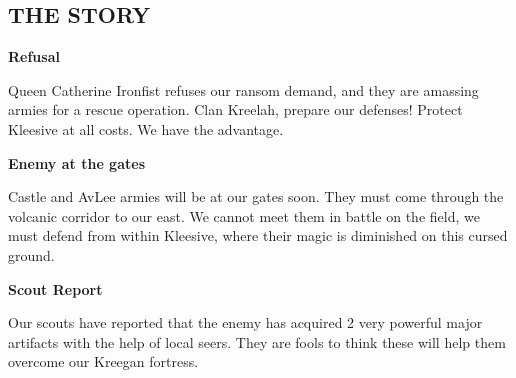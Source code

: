 \begin{multicols}{2}
\subsection*{\MakeUppercase{The Story}}

\textbf{Refusal}

Queen Catherine Ironfist refuses our ransom demand, and they are amassing armies for a rescue operation.
Clan Kreelah, prepare our defenses!
Protect Kleesive at all costs.
We have the advantage.

\textbf{Enemy at the gates}

Castle and AvLee armies will be at our gates soon.
They must come through the volcanic corridor to our east.
We cannot meet them in battle on the field, we must defend from within Kleesive, where their magic is diminished on this cursed ground.  %

\textbf{Scout Report}

Our scouts have reported that the enemy has acquired 2 very powerful major artifacts with the help of local seers.
They are fools to think these will help them overcome our Kreegan fortress.

\end{multicols}
\vspace*{-1em}
